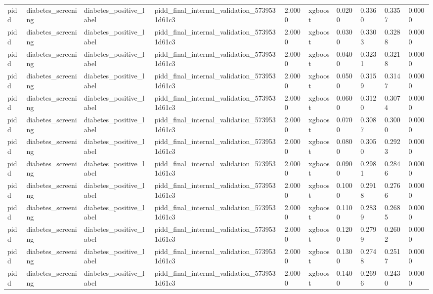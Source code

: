 \begin{tabular}{llllllllll}
pidd & diabetes\_screening & diabetes\_positive\_label & pidd\_final\_internal\_validation\_5739531d61c3 & 2.0000 & xgboost & 0.0200 & 0.3360 & 0.3357 & 0.0000 \\
pidd & diabetes\_screening & diabetes\_positive\_label & pidd\_final\_internal\_validation\_5739531d61c3 & 2.0000 & xgboost & 0.0300 & 0.3303 & 0.3288 & 0.0000 \\
pidd & diabetes\_screening & diabetes\_positive\_label & pidd\_final\_internal\_validation\_5739531d61c3 & 2.0000 & xgboost & 0.0400 & 0.3231 & 0.3218 & 0.0000 \\
pidd & diabetes\_screening & diabetes\_positive\_label & pidd\_final\_internal\_validation\_5739531d61c3 & 2.0000 & xgboost & 0.0500 & 0.3159 & 0.3147 & 0.0000 \\
pidd & diabetes\_screening & diabetes\_positive\_label & pidd\_final\_internal\_validation\_5739531d61c3 & 2.0000 & xgboost & 0.0600 & 0.3120 & 0.3074 & 0.0000 \\
pidd & diabetes\_screening & diabetes\_positive\_label & pidd\_final\_internal\_validation\_5739531d61c3 & 2.0000 & xgboost & 0.0700 & 0.3087 & 0.3000 & 0.0000 \\
pidd & diabetes\_screening & diabetes\_positive\_label & pidd\_final\_internal\_validation\_5739531d61c3 & 2.0000 & xgboost & 0.0800 & 0.3050 & 0.2923 & 0.0000 \\
pidd & diabetes\_screening & diabetes\_positive\_label & pidd\_final\_internal\_validation\_5739531d61c3 & 2.0000 & xgboost & 0.0900 & 0.2981 & 0.2846 & 0.0000 \\
pidd & diabetes\_screening & diabetes\_positive\_label & pidd\_final\_internal\_validation\_5739531d61c3 & 2.0000 & xgboost & 0.1000 & 0.2918 & 0.2766 & 0.0000 \\
pidd & diabetes\_screening & diabetes\_positive\_label & pidd\_final\_internal\_validation\_5739531d61c3 & 2.0000 & xgboost & 0.1100 & 0.2839 & 0.2685 & 0.0000 \\
pidd & diabetes\_screening & diabetes\_positive\_label & pidd\_final\_internal\_validation\_5739531d61c3 & 2.0000 & xgboost & 0.1200 & 0.2799 & 0.2602 & 0.0000 \\
pidd & diabetes\_screening & diabetes\_positive\_label & pidd\_final\_internal\_validation\_5739531d61c3 & 2.0000 & xgboost & 0.1300 & 0.2748 & 0.2517 & 0.0000 \\
pidd & diabetes\_screening & diabetes\_positive\_label & pidd\_final\_internal\_validation\_5739531d61c3 & 2.0000 & xgboost & 0.1400 & 0.2696 & 0.2430 & 0.0000 \\

\end{tabular}

